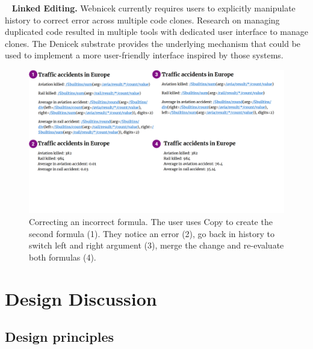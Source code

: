 \documentclass[sigconf,anonymous,screen]{acmart}
\DeclareRobustCommand{\keyideabox}[3]{\begin{tcolorbox}[breakable,
  boxsep=5pt,left=0pt,right=0pt,top=0pt,bottom=0pt,width=\dimexpr\columnwidth\relax,
  colback=gray!20,colframe=gray!20,
  enlarge bottom by=0pt,enlarge top by=0pt,
  arc=0pt,outer arc=0pt]
\lettrine[lraise=0.3]{\LARGE #1}{~}
\small \textbf{#2.} #3
\end{tcolorbox}
}
\begin{document}
\keyideabox{\faClipboard}{Linked Editing}{Webnicek currently requires users to explicitly
manipulate history to correct error across multiple code clones. Research on managing duplicated
code resulted in multiple tools \cite{toomim-2004-linked,duala-ekoko-2008-clone} with dedicated
user interface to manage clones. The Denicek substrate provides the underlying mechanism that
could be used to implement a more user-friendly interface inspired by those systems.}


\begin{figure}[t]
\includegraphics[width=1\columnwidth,clip,trim=0cm 5.5cm 1cm 0cm]{fig/copypaste.pdf}
\vspace{-1em}
\caption{Correcting an incorrect formula. The user uses Copy to create the second
formula (1). They notice an error (2), go back in history to switch left and right argument (3),
merge the change and re-evaluate both formulas (4).}
\label{fig:copypaste}
\vspace{-0.5em}
\end{figure}


\section{Design Discussion}
\label{sec:discuss}

\subsection{Design principles}
\label{sec:discuss-principles}
\end{document}
